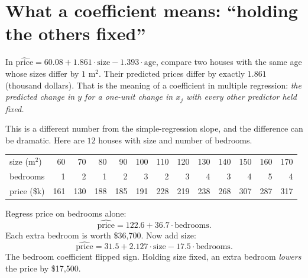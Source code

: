 \section{What a coefficient means: ``holding the others fixed''}
\label{sec:mlr-interpret}

In $\widehat{\text{price}} = 60.08 + 1.861\cdot\text{size} - 1.393\cdot\text{age}$,
compare two houses with the same age whose sizes differ by $1$ m$^2$. Their predicted
prices differ by exactly $1.861$ (thousand dollars). That is the meaning of a
coefficient in multiple regression: \emph{the predicted change in $y$ for a one-unit
change in $x_j$ with every other predictor held fixed.}

This is a different number from the simple-regression slope, and the difference can be
dramatic. Here are $12$ houses with size and number of bedrooms.

\begin{center}
\begin{tabular}{l*{12}{r}}
\toprule
size (m$^2$) & 60 & 70 & 80 & 90 & 100 & 110 & 120 & 130 & 140 & 150 & 160 & 170\\
bedrooms & 1 & 2 & 1 & 2 & 3 & 2 & 3 & 4 & 3 & 4 & 5 & 4\\
price (\$k) & 161 & 130 & 188 & 185 & 191 & 228 & 219 & 238 & 268 & 307 & 287 & 317\\
\bottomrule
\end{tabular}
\end{center}

Regress price on bedrooms alone:
\[
  \widehat{\text{price}} = 122.6 + 36.7\cdot\text{bedrooms}.
\]
Each extra bedroom is worth \$36{,}700. Now add size:
\[
  \widehat{\text{price}} = 31.5 + 2.127\cdot\text{size} - 17.5\cdot\text{bedrooms}.
\]
The bedroom coefficient flipped sign. Holding size fixed, an extra bedroom
\emph{lowers} the price by \$17{,}500.

